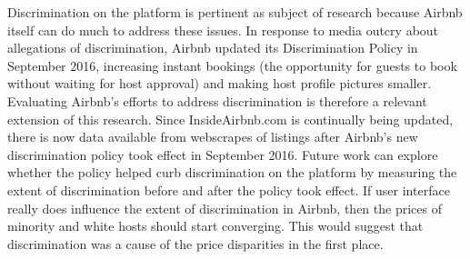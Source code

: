 Discrimination on the platform is pertinent as subject of research because Airbnb itself can do much to address these issues. In response to media outcry about allegations of discrimination, Airbnb updated its Discrimination Policy in September 2016, increasing instant bookings (the opportunity for guests to book without waiting for host approval) and making host profile pictures smaller. Evaluating Airbnb's efforts to address discrimination is therefore a relevant extension of this research. Since InsideAirbnb.com is continually being updated, there is now data available from webscrapes of listings after Airbnb's new discrimination policy took effect in September 2016. Future work can explore whether the policy helped curb discrimination on the platform by measuring the extent of discrimination before and after the policy took effect. If user interface really does influence the extent of discrimination in Airbnb, then the prices of minority and white hosts should start converging. This would suggest that discrimination was a cause of the price disparities in the first place. 

